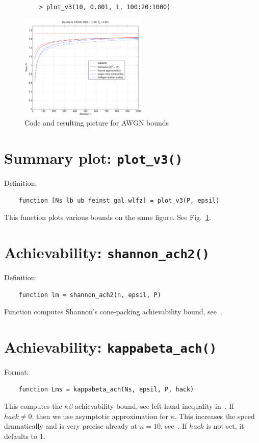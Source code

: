 \documentclass[a4paper,11p]{memoir}
\begin{document}
\begin{figure}
\centering
\begin{verbatim}
	> plot_v3(10, 0.001, 1, 100:20:1000)
\end{verbatim}
\includegraphics[height=5cm]{plots/awgn_plot3_ex.pdf}
\caption{Code and resulting picture for AWGN bounds}\label{fig:awgn_example}
\end{figure}


\section{Summary plot: \texttt{plot\_v3()}}

Definition:
\begin{verbatim}
	function [Ns lb ub feinst gal wlfz] = plot_v3(P, epsil)
\end{verbatim}

This function plots various bounds on the same figure. See Fig.~\ref{fig:awgn_example}.


\section{Achievability: \texttt{shannon\_ach2()}}

Definition:
\begin{verbatim}
	function lm = shannon_ach2(n, epsil, P)
\end{verbatim}

Function computes Shannon's cone-packing achievability bound, see~\cite[(41)]{PPV08}.

\section{Achievability: \texttt{kappabeta\_ach()}}
Format:
\begin{verbatim}
	function Lms = kappabeta_ach(Ns, epsil, P, hack)
\end{verbatim}

This computes the $\kappa\beta$ achievability bound, see left-hand inequality in~\cite[(218)]{PPV08}. If $hack\neq 0$, then we
use asymptotic approximation for $\kappa$. This increases the speed dramatically and is very precise already at $n=10$,
see~\cite[(217)]{PPV08}. If $hack$ is not set, it defaults to $1$.
\end{document}
